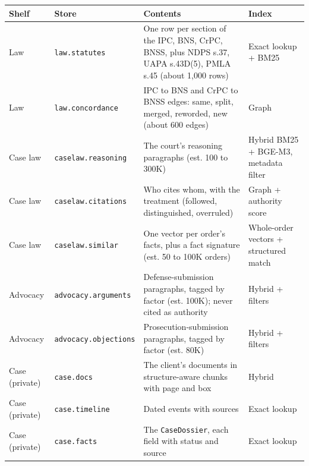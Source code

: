 \documentclass[10pt,a4paper]{article}
\newcommand{\st}[1]{\texttt{\small #1}}
\begin{document}
{\small
\begin{xltabular}{\linewidth}{@{}>{\raggedright\arraybackslash{}\hsize}X>{\raggedright\arraybackslash{}\hsize}X>{\raggedright\arraybackslash{}\hsize}X>{\raggedright\arraybackslash{}\hsize}X@{}}
\toprule
\textbf{Shelf} & \textbf{Store} & \textbf{Contents} & \textbf{Index} \\
\midrule
\endhead
Law & \st{law.statutes} & One row per section of the IPC, BNS, CrPC, BNSS, plus NDPS s.37, UAPA s.43D(5), PMLA s.45 (about 1,000 rows) & Exact lookup + BM25 \\
Law & \st{law.concordance} & IPC to BNS and CrPC to BNSS edges: same, split, merged, reworded, new (about 600 edges) & Graph \\
Case law & \st{caselaw.reasoning} & The court's reasoning paragraphs (est. 100 to 300K) & Hybrid BM25 + BGE-M3, metadata filter \\
Case law & \st{caselaw.citations} & Who cites whom, with the treatment (followed, distinguished, overruled) & Graph + authority score \\
Case law & \st{caselaw.similar} & One vector per order's facts, plus a fact signature (est. 50 to 100K orders) & Whole-order vectors + structured match \\
Advocacy & \st{advocacy.arguments} & Defense-submission paragraphs, tagged by factor (est. 100K); never cited as authority & Hybrid + filters \\
Advocacy & \st{advocacy.objections} & Prosecution-submission paragraphs, tagged by factor (est. 80K) & Hybrid + filters \\
Case (private) & \st{case.docs} & The client's documents in structure-aware chunks with page and box & Hybrid \\
Case (private) & \st{case.timeline} & Dated events with sources & Exact lookup \\
Case (private) & \st{case.facts} & The \st{CaseDossier}, each field with status and source & Exact lookup \\
\bottomrule
\end{xltabular}}
\end{document}
